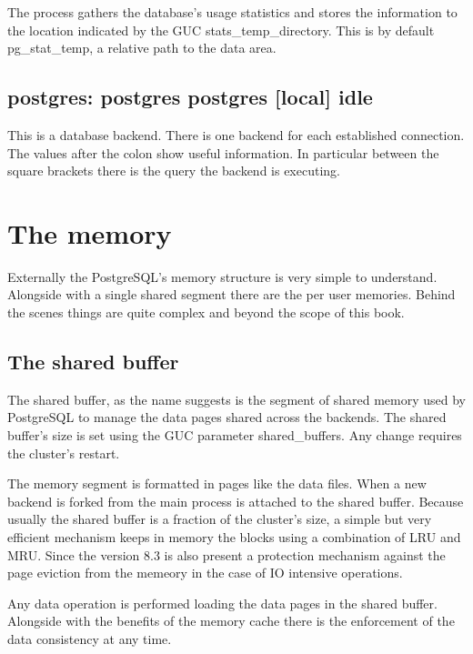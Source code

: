 The process gathers the database's usage statistics and stores the information
to the location indicated by the GUC stats\_temp\_directory. This is by default
pg\_stat\_temp, a relative path to the data area.

\subsection{postgres: postgres postgres [local] idle}

This is a database backend. There is one backend for each established
connection. The values after the colon show useful information. In particular
between the square brackets there is the query the backend is executing.

\section{The memory}

\label{sec:MEMORY}

Externally the PostgreSQL's memory structure is very simple to understand.
Alongside with a single shared segment there are the per user memories. Behind
the scenes things are quite complex and beyond the scope of this book.

\subsection{The shared buffer}


The shared buffer, as the name suggests is the segment of shared memory used by
PostgreSQL to manage the data pages shared across the backends. The shared
buffer's size is set using the GUC parameter
shared\_buffers. Any change requires the cluster's
restart.\newline

The memory segment is formatted in pages like the data files. When a new
backend is forked from the main process is attached to the shared buffer.
Because usually the shared buffer is a fraction of the cluster's size, a simple
but very efficient mechanism keeps in memory the blocks using a combination of
LRU and MRU. Since the version 8.3 is also present a protection mechanism
against the page eviction from the memeory in the case of IO intensive
operations.\newline

Any data operation is performed loading the data pages in the shared buffer.
Alongside with the benefits of the memory cache there is the enforcement of the
data consistency at any time.\newline

